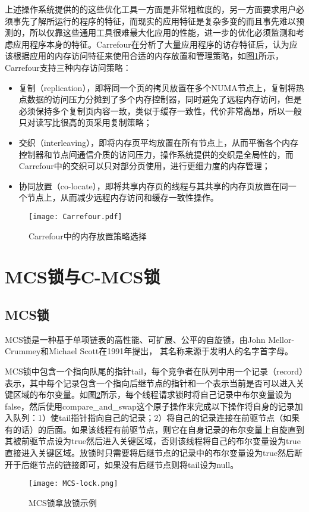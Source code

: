 上述操作系统提供的的这些优化工具一方面是非常粗粒度的，另一方面要求用户必须事先了解所运行的程序的特征，而现实的应用特征是复杂多变的而且事先难以预测的，所以仅靠这些通用工具很难最大化应用的性能，进一步的优化必须监测和考虑应用程序本身的特征。Carrefour\cite{dashti2013traffic}在分析了大量应用程序的访存特征后，认为应该根据应用的内存访问特征来使用合适的内存放置和管理策略，如图\ref{Fig:carrefour}所示，Carrefour支持三种内存访问策略：
\begin{itemize}
\item  复制（replication），即将同一个页的拷贝放置在多个NUMA节点上，复制将热点数据的访问压力分摊到了多个内存控制器，同时避免了远程内存访问，但是必须保持多个复制页内容一致，类似于缓存一致性，代价非常高昂，所以一般只对读写比很高的页采用复制策略；
\item  交织（interleaving），即将内存页平均放置在所有节点上，从而平衡各个内存控制器和节点间通信介质的访问压力，操作系统提供的交织是全局性的，而Carrefour中的交织可以只对部分页使用，进行更细力度的内存管理；
\item 协同放置（co-locate），即将共享内存页的线程与其共享的内存页放置在同一个节点上，从而减少远程内存访问和缓存一致性操作。
\end{itemize}

\begin{figure}[t]
	\centering
	\texttt{[image: Carrefour.pdf]}
	\caption{Carrefour中的内存放置策略选择}
	\label{Fig:carrefour}
\end{figure}

\section{MCS锁与C-MCS锁}
\subsection{MCS锁}
MCS锁是一种基于单项链表的高性能、可扩展、公平的自旋锁，由John Mellor-Crummey和Michael Scott在1991年提出， 其名称来源于发明人的名字首字母。

MCS锁中包含一个指向队尾的指针tail，每个竞争者在队列中用一个记录（record）表示，其中每个记录包含一个指向后继节点的指针和一个表示当前是否可以进入关键区域的布尔变量。如图\ref{Fig:MCS}所示，每个线程请求锁时将自己记录中布尔变量设为false，然后使用compare\_and\_swap这个原子操作来完成以下操作将自身的记录加入队列：1）使tail指针指向自己的记录；2）将自己的记录连接在前驱节点（如果有的话）的后面。如果该线程有前驱节点，则它在自身记录的布尔变量上自旋直到其被前驱节点设为true然后进入关键区域，否则该线程将自己的布尔变量设为true直接进入关键区域。放锁时只需要将后继节点的记录中的布尔变量设为true然后断开于后继节点的链接即可，如果没有后继节点则将tail设为null。
\begin{figure}[t]
	\centering
	\texttt{[image: MCS-lock.png]}
	\caption{MCS锁拿放锁示例}
	\label{Fig:MCS}
\end{figure}

